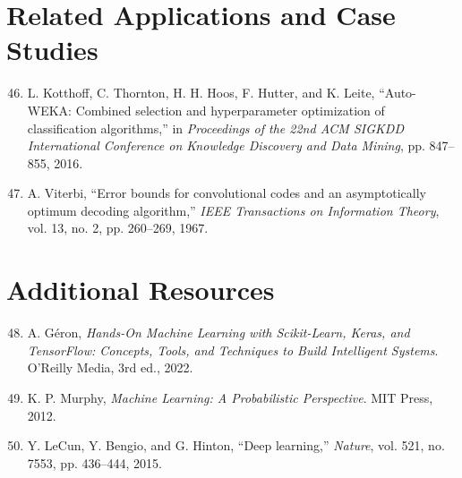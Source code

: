 \section*{Related Applications and Case Studies}

\begin{enumerate}
  \setcounter{enumi}{45}
  \item L. Kotthoff, C. Thornton, H. H. Hoos, F. Hutter, and K. Leite, ``Auto-WEKA: Combined selection and hyperparameter optimization of classification algorithms,'' in \textit{Proceedings of the 22nd ACM SIGKDD International Conference on Knowledge Discovery and Data Mining}, pp. 847--855, 2016.
  
  \item A. Viterbi, ``Error bounds for convolutional codes and an asymptotically optimum decoding algorithm,'' \textit{IEEE Transactions on Information Theory}, vol. 13, no. 2, pp. 260--269, 1967.
\end{enumerate}

\section*{Additional Resources}

\begin{enumerate}
  \setcounter{enumi}{47}
  \item A. Géron, \textit{Hands-On Machine Learning with Scikit-Learn, Keras, and TensorFlow: Concepts, Tools, and Techniques to Build Intelligent Systems}. O'Reilly Media, 3rd ed., 2022.
  
  \item K. P. Murphy, \textit{Machine Learning: A Probabilistic Perspective}. MIT Press, 2012.
  
  \item Y. LeCun, Y. Bengio, and G. Hinton, ``Deep learning,'' \textit{Nature}, vol. 521, no. 7553, pp. 436--444, 2015.
\end{enumerate}


